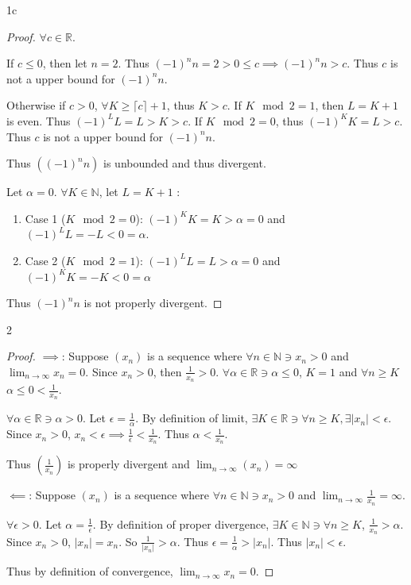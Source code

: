 \documentclass{article}
\newcommand{\R}{\mathbb{R}}
\newcommand{\N}{\mathbb{N}}
\newcommand{\ceil}[1]{\lceil{#1}\rceil}
\begin{document}
\begin{PROB}{1c}\label{Problem 1c.}
\end{PROB} 
\begin{proof}
     
    
    $\forall c \in \R$. 
    
    
    If $c \leq 0$, then let $n = 2$. Thus $(-1)^n n = 2 > 0 \leq c \implies (-1)^n n > c$. Thus $c$ is not a upper bound for $(-1)^n n$.              
    
    Otherwise if $c > 0$, $\forall K \geq \ceil{c} + 1$, thus $K > c$. If $K \mod 2 = 1$, then $L = K + 1$ is even. Thus $(-1)^L L = L > K > c$. If $K \mod 2 = 0$, thus $(-1)^K K = L > c$. Thus $c$ is not a upper bound for $(-1)^n n$.               
    
    Thus $\left((-1)^n n\right)$ is unbounded and thus divergent.

    Let $\alpha = 0$. $\forall K \in \N$, let $L = K + 1$ :
    
    \begin{enumerate}
        \item Case 1 ($K \mod 2 = 0$): $(-1)^K K = K > \alpha = 0$ and $(-1)^L L = -L < 0 = \alpha$. 
        \item Case 2 ($K \mod 2 = 1$): $(-1)^L L = L > \alpha = 0$ and $(-1)^K K = -K < 0 = \alpha$  
    \end{enumerate}

    Thus $(-1)^n n$ is not properly divergent.  
    
\end{proof}

\bigskip


\begin{PROB}{2}\label{Problem 2.}
\end{PROB}
\begin{proof}
    $\implies$: Suppose $(x_n)$ is a sequence where $\forall n \in \N \ni x_n > 0$ and $\lim_{n \to \infty} x_n = 0$. Since $x_n > 0$, then $\frac{1}{x_n} > 0$. $\forall \alpha \in \R \ni \alpha \leq 0$, $K = 1$ and $\forall n \geq K$ $\alpha \leq 0 < \frac{1}{x_n}$. 
    
    $\forall \alpha \in \R \ni \alpha > 0$. Let $\epsilon = \frac{1}{\alpha}$. By definition of limit, $\exists K \in \R \ni \forall n \geq K , \exists |x_n| < \epsilon$. Since $x_n > 0$, $x_n < \epsilon \implies \frac{1}{\epsilon} < \frac{1}{x_n}$. Thus $\alpha < \frac{1}{x_n}$. 
    
    Thus $(\frac{1}{x_n})$ is properly divergent and $\lim_{n \to \infty}(x_n) = \infty$
    
    $\impliedby$: Suppose $(x_n)$ is a sequence where $\forall n \in \N \ni x_n > 0$ and $\lim_{n \to \infty} \frac{1}{x_n} = \infty$.
    
    $\forall \epsilon > 0$. Let $\alpha = \frac{1}{\epsilon}$. By definition of proper divergence, $\exists K \in \N \ni \forall n \geq K$, $\frac{1}{x_n} > \alpha$. Since $x_n > 0$, $|x_n| = x_n$. So $\frac{1}{|x_n|} > \alpha$. Thus $\epsilon = \frac{1}{\alpha} > |x_n|$. Thus $|x_n| < \epsilon$. 
    
    Thus by definition of convergence, $\lim_{n \to \infty} x_n = 0$.  
\end{proof}
\end{document}
